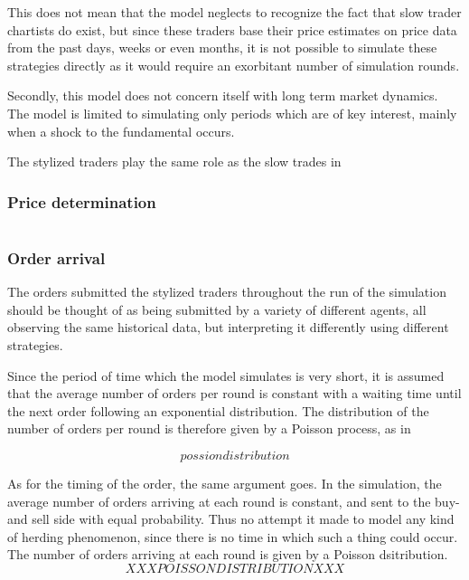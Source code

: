 This does not mean that the model neglects to recognize the fact that slow trader chartists do exist, but since these traders base their price estimates on price data from the past days, weeks or even months, it is not possible to simulate these strategies directly as it would require an exorbitant number of simulation rounds.







Secondly, this model does not concern itself with long term market dynamics. The model is limited to simulating only periods which are of key interest, mainly when a shock to the fundamental occurs.
 



The stylized traders play the same role as the slow trades in \cite{strategicLiquiditySupply}
\subsubsection*{Price determination}

\begin{equation}
\label{eq:slow_trader_price_determination}
\end{equation}

\subsubsection{Order arrival}
The orders submitted the stylized traders throughout the run of the simulation should be thought of as being submitted by a variety of different agents, all observing the same historical data, but interpreting it differently using different strategies. 

Since the period of time which the model simulates is very short, it is assumed that the average number of orders per round is constant with a waiting time until the next order following an exponential distribution. The distribution of the number of orders per round is therefore given by a Poisson process, as in \cite{}

\begin{equation}\label{eq:poisson_distribution}
possion distribution
\end{equation}

As for the timing of the order, the same argument goes. In the simulation, the average number of orders arriving at each round is constant, and sent to the buy- and sell side with equal probability. Thus no attempt it made to model any kind of herding phenomenon, since there is no time in which such a thing could occur. The number of orders arriving at each round is given by a Poisson dsitribution.
\begin{equation}
XXX POISSON DISTRIBUTION XXX
\end{equation}


